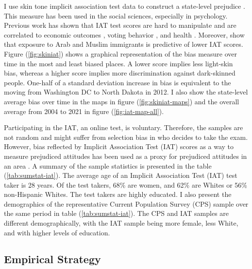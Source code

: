\documentclass[12pt, fullpage]{article}
\begin{document}
I use skin tone implicit association test data to construct a state-level prejudice \citep{greenwaldMeasuringIndividualDifferences1998}. This measure has been used in the social sciences, especially in psychology. Previous work has shown that IAT test scores are hard to manipulate \citep{egloffPredictiveValidityImplicit2002} and are correlated to economic outcomes \citep{chettyRaceEconomicOpportunity2020,gloverDiscriminationSelfFulfillingProphecy2017}, voting behavior \citep{friesePredictingVotingBehavior2007}, and health \citep{leitnerRacialBiasAssociated2016}. Moreover, \citet{bursztynImmigrantNextDoor2022} show that exposure to Arab and Muslim immigrants is predictive of lower IAT scores. Figure (\ref{fig:skiniat}) shows a graphical representation of the bias measure over time in the most and least biased places. A lower score implies less light-skin bias, whereas a higher score implies more discrimination against dark-skinned people. One-half of a standard deviation increase in bias is equivalent to the moving from Washington DC to North Dakota in 2012. I also show the state-level average bias over time in the maps in figure (\ref{fig:skiniat-maps}) and the overall average from 2004 to 2021 in figure (\ref{fig:iat-map-all}).

Participating in the IAT, an online test, is voluntary. Therefore, the samples are not random and might suffer from selection bias in who decides to take the exam. However,  bias reflected by Implicit Association Test (IAT) scores as a way to measure prejudiced attitudes has been used as a proxy for prejudiced attitudes in an area \citet{chettyRaceEconomicOpportunity2020}. A summary of the sample statistics is presented in the table (\ref{tab:sumstat-iat}). The average age of an Implicit Association Test (IAT) test taker is 28 years. Of the test takers, 68\% are women, and 62\% are Whites or 56\% non-Hispanic Whites. The test takers are highly educated. I also present the demographics of the representative Current Population Survey (CPS) sample over the same period in table (\ref{tab:sumstat-iat}). The CPS and IAT samples are different demographically, with the IAT sample being more female, less White, and with higher levels of education.




\subsection{Empirical Strategy}\label{sec:empstrat}
\end{document}
